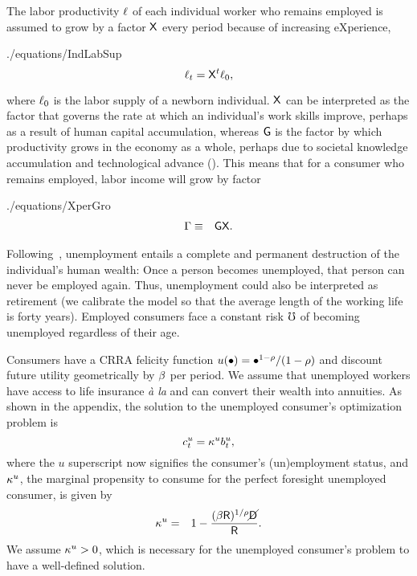 \documentclass[titlepage,abstract,letterpaper]{econtex}
\begin{document}
The labor
productivity $\ell$ of each individual worker who remains employed
is assumed to grow by a factor $\mathsf{X}$ every period because of increasing
eXperience,
\begin{verbatimwrite}{./equations/IndLabSup}
\begin{equation}
\ell_{t} =    \mathsf{X}^t \ell_{0}
\label{eq:IndLabSup},
\end{equation}
\end{verbatimwrite}

where $\ell_0$ is the labor supply of a newborn
individual. $\mathsf{X}$ can be interpreted as the factor that governs
the rate at which an individual's work skills improve, perhaps as a
result of human capital accumulation, whereas $\mathsf{G}$ is the factor by
which productivity grows in the economy as a whole, perhaps due to
societal knowledge accumulation and technological advance
(\cite{mankiw:growth}). This means that for a consumer who remains
employed, labor income will grow by factor
\begin{verbatimwrite}{./equations/XperGro}
\begin{eqnarray*}
\Gamma & \equiv & \mathsf{G} \mathsf{X}.
\end{eqnarray*}
\end{verbatimwrite}


Following~\cite{toche:urisk}, unemployment entails a complete and permanent destruction of the individual's human wealth: Once a person becomes unemployed, that person can never be employed
again. Thus, unemployment could also be interpreted as retirement (we calibrate the model so that the average length of the working life is forty years). Employed consumers face a constant risk $\mho$ of becoming unemployed regardless of their age.

Consumers have a CRRA felicity function $u(\bullet)=
\bullet^{1-\rho}/(1-\rho)$ and discount future utility geometrically by $\beta$ per period.
We assume that unemployed workers have access to life insurance {\it \`{a} la} \cite{blanchardFinite} and can convert their wealth into annuities.
As shown in the appendix, the solution to the unemployed consumer's optimization problem is
\begin{equation}
c^{u}_{t} = \kappa^{u} b^{u}_t
\label{eq:cpfinfhorunemp} ,
\end{equation}
where the $u$ superscript now signifies the consumer's (un)employment status, and $\kappa^{u}$, the marginal propensity to consume for the perfect foresight unemployed consumer, is given by
\begin{eqnarray}
\kappa^{u} & = & 1- \frac{(\beta \mathsf{R})^{1/\rho}\cancel{\mathsf{D}}}{\mathsf{R}}.
\label{eq:kappaDef}
\end{eqnarray}
We assume $\kappa^{u} > 0$, which is necessary for the unemployed consumer's problem to have a well-defined solution.
\end{document}
